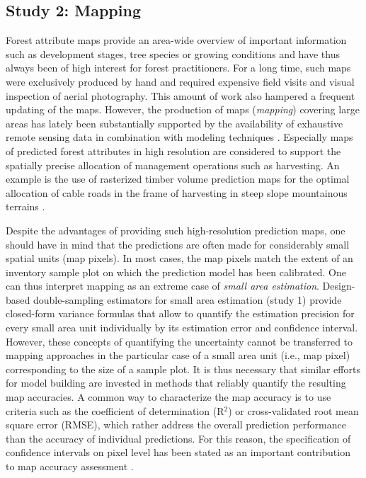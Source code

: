 \subsection{Study 2: Mapping} %
\label{sec:study2}


Forest attribute maps provide an area-wide overview of important information such as development stages, tree species or growing conditions and have thus always been of high interest for forest practitioners. For a long time, such maps were exclusively produced by hand and required expensive field visits and visual inspection of aerial photography. This amount of work also hampered a frequent updating of the maps. However, the production of maps (\textit{mapping}) covering large areas has lately been substantially supported by the availability of exhaustive remote sensing data in combination with modeling techniques \citep{brosofske2014}. Especially maps of predicted forest attributes in high resolution are considered to support the spatially precise allocation of management operations such as harvesting. An example is the use of rasterized timber volume prediction maps for the optimal allocation of cable roads in the frame of harvesting in steep slope mountainous terrains \citep{bont2012, bont2015}.\par

Despite the advantages of providing such high-resolution prediction maps, one should have in mind that the predictions are often made for considerably small spatial units (map pixels). In most cases, the map pixels match the extent of an inventory sample plot on which the prediction model has been calibrated. One can thus interpret mapping as an extreme case of \textit{small area estimation}. Design-based double-sampling estimators for small area estimation (study 1) provide closed-form variance formulas that allow to quantify the estimation precision for every small area unit individually by its estimation error and confidence interval. However, these concepts of quantifying the uncertainty cannot be transferred to mapping approaches in the particular case of a small area unit (i.e., map pixel) corresponding to the size of a sample plot. It is thus necessary that similar efforts for model building are invested in methods that reliably quantify the resulting map accuracies. A common way to characterize the map accuracy is to use criteria such as the coefficient of determination (R$^2$) or cross-validated root mean square error (RMSE), which rather address the overall prediction performance than the accuracy of individual predictions. For this reason, the specification of confidence intervals on pixel level has been stated as an important contribution to map accuracy assessment \citep{mcroberts2010a}.\par

